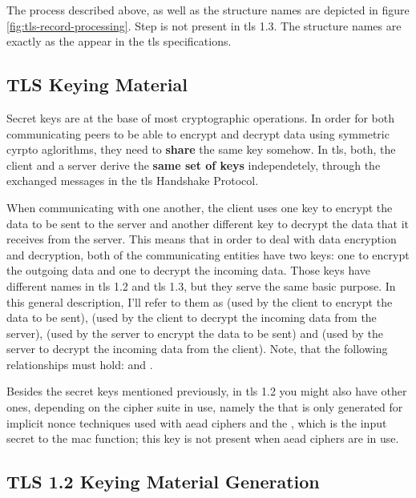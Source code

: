 \documentclass{llncs}
\begin{document}
The process described above, as well as the structure names are depicted in figure \ref{fig:tls-record-processing}.
Step  is not present in \gls{tls} 1.3. The structure names are exactly as the appear in the \gls{tls} specifications.

\subsection{TLS Keying Material}

Secret keys are at the base of most cryptographic operations.
In order for both communicating peers to be able to encrypt and decrypt data
using symmetric cyrpto aglorithms, they need to \textbf{share} the same key
somehow. In \gls{tls}, both, the client and a server derive the \textbf{same set of keys}
independetely, through the exchanged messages in the \gls{tls} Handshake Protocol.

When communicating with one another, the client uses one key to
encrypt the data to be sent to the server and another different key to decrypt the data
that it receives from the server. This means that in order to deal with data
encryption and decryption, both of the communicating entities have two keys:
one to encrypt the outgoing data and one to decrypt the incoming data. Those keys
have different names in \gls{tls} 1.2 and \gls{tls} 1.3, but they serve the same
basic purpose. In this general description, I'll refer to them as 
(used by the client to encrypt the data to be sent), (used by the client to
decrypt the incoming data from the server), (used by the server to encrypt
the data to be sent) and (used by the server to decrypt the incoming
data from the client). Note, that the following relationships must hold:
 and .

Besides the secret keys mentioned previously, in \gls{tls} 1.2 you might also have other ones,
depending on the cipher suite in use, namely the  that
is only generated for implicit nonce techniques used with \gls{aead} ciphers and the
, which is the input secret to the \gls{mac}
function; this key is not present when \gls{aead} ciphers are in use.

\subsection{TLS 1.2 Keying Material Generation}
\end{document}
